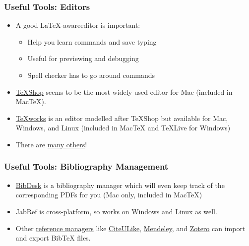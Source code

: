 \begin{frame}
\frametitle{Useful Tools: Editors}

\begin{itemize}
\item A good \LaTeX-awareeditor is important:
\begin{itemize}
\item Help you learn commands and save typing
\item Useful for previewing and debugging
\item Spell checker has to go around commands
\end{itemize}
\item \href{http://pages.uoregon.edu/koch/texshop/texshop.html}{TeXShop}
 seems to be the most widely used editor for Mac (included in MacTeX).
\item \href{http://www.tug.org/texworks/}{TeXworks} is an editor 
modelled after TeXShop but available for Mac, Windows, and Linux 
(included in MacTeX and TeXLive for Windows)
\item There are \href{http://en.wikipedia.org/wiki/Comparison_of_TeX_editors}{many others}!
\end{itemize}

\end{frame}

\begin{frame}
\frametitle{Useful Tools: Bibliography Management}

\begin{itemize}
\item \href{http://bibdesk.sourceforge.net/}{BibDesk} is a bibliography manager which will even keep track of the corresponding PDFs for you (Mac only, included in MacTeX)
\item \href{http://jabref.sourceforge.net/}{JabRef} is cross-platform, so works on Windows and Linux as well.
\item Other \href{http://en.wikipedia.org/wiki/Comparison_of_reference_management_software}{reference managers} like \href{http://www.citeulike.org/}{CiteULike}, \href{http://www.mendeley.com/}{Mendeley}, and \href{http://www.zotero.org/}{Zotero} can import and export Bib\TeX{} files. 
\end{itemize}

\end{frame}

